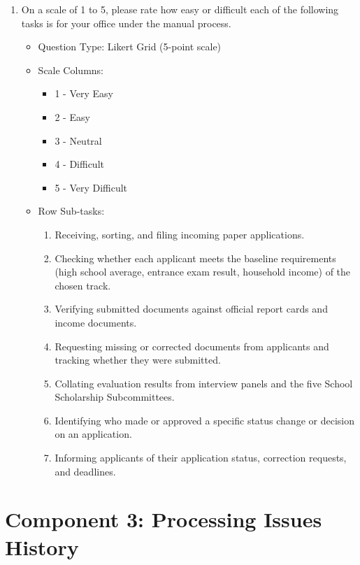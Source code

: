\begin{enumerate}[resume=q, label={Question \arabic*:}, leftmargin=*, align=left]
  \item On a scale of 1 to 5, please rate how easy or difficult each of the following tasks is for your office under the manual process.
  \begin{itemize}[leftmargin=*]
    \item Question Type: Likert Grid (5-point scale)
    \item Scale Columns:
    \begin{itemize}[leftmargin=*]
      \item 1 - Very Easy
      \item 2 - Easy
      \item 3 - Neutral
      \item 4 - Difficult
      \item 5 - Very Difficult
    \end{itemize}
    \item Row Sub-tasks:
    \begin{enumerate}[label=\arabic*., leftmargin=*]
      \item Receiving, sorting, and filing incoming paper applications.
      \item Checking whether each applicant meets the baseline requirements (high school average, entrance exam result, household income) of the chosen track.
      \item Verifying submitted documents against official report cards and income documents.
      \item Requesting missing or corrected documents from applicants and tracking whether they were submitted.
      \item Collating evaluation results from interview panels and the five School Scholarship Subcommittees.
      \item Identifying who made or approved a specific status change or decision on an application.
      \item Informing applicants of their application status, correction requests, and deadlines.
    \end{enumerate}
  \end{itemize}
\end{enumerate}

\section{Component 3: Processing Issues History}


